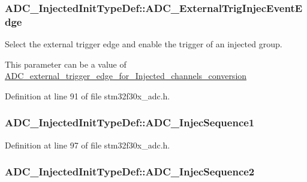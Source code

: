 \hypertarget{struct_a_d_c___injected_init_type_def_a10ddce26a0a3fb472f779636e6ace1a7}{
\subsubsection[{A\-D\-C\-\_\-\-External\-Trig\-Injec\-Event\-Edge}]{ A\-D\-C\-\_\-\-Injected\-Init\-Type\-Def\-::\-A\-D\-C\-\_\-\-External\-Trig\-Injec\-Event\-Edge}}\label{struct_a_d_c___injected_init_type_def_a10ddce26a0a3fb472f779636e6ace1a7}
\begin{DoxyVerb}     Select the external trigger edge and enable the trigger of an injected group. 
\end{DoxyVerb}
 This parameter can be a value of \hyperlink{group___a_d_c__external__trigger__edge__for___injected__channels__conversion}{A\-D\-C\-\_\-external\-\_\-trigger\-\_\-edge\-\_\-for\-\_\-\-Injected\-\_\-channels\-\_\-conversion} 

Definition at line 91 of file stm32f30x\-\_\-adc.\-h.

\hypertarget{struct_a_d_c___injected_init_type_def_a9db3c5a6db391effabae91b1b692a041}{
\subsubsection[{A\-D\-C\-\_\-\-Injec\-Sequence1}]{ A\-D\-C\-\_\-\-Injected\-Init\-Type\-Def\-::\-A\-D\-C\-\_\-\-Injec\-Sequence1}}\label{struct_a_d_c___injected_init_type_def_a9db3c5a6db391effabae91b1b692a041}


Definition at line 97 of file stm32f30x\-\_\-adc.\-h.

\hypertarget{struct_a_d_c___injected_init_type_def_a88cc764d85dea2c85285a2bad0c1aa3f}{
\subsubsection[{A\-D\-C\-\_\-\-Injec\-Sequence2}]{ A\-D\-C\-\_\-\-Injected\-Init\-Type\-Def\-::\-A\-D\-C\-\_\-\-Injec\-Sequence2}}\label{struct_a_d_c___injected_init_type_def_a88cc764d85dea2c85285a2bad0c1aa3f}


